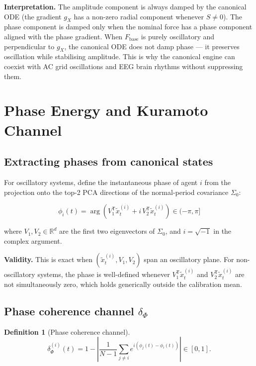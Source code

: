 \documentclass[11pt,a4paper]{article}
\theoremstyle{definition}
\newtheorem{definition}[theorem]{Definition}
\newcommand{\R}{\mathbb{R}}
\newcommand{\T}{^{\mathsf{T}}}
\newcommand{\Fbase}{F_{\mathrm{base}}}
\newcommand{\gX}{g_X}
\begin{document}
\textbf{Interpretation.}
The amplitude component is always damped by the canonical ODE
(the gradient $\gX$ has a non-zero radial component whenever $S \neq 0$).
The phase component is damped only when the nominal force has a phase component
aligned with the phase gradient.
When $\Fbase$ is purely oscillatory and perpendicular to $\gX$,
the canonical ODE does not damp phase — it preserves oscillation while
stabilising amplitude.
This is why the canonical engine can coexist with AC grid oscillations
and EEG brain rhythms without suppressing them.

\section{Phase Energy and Kuramoto Channel}

\subsection{Extracting phases from canonical states}

For oscillatory systems, define the instantaneous phase of agent $i$
from the projection onto the top-2 PCA directions of the normal-period covariance $\Sigma_0$:

\begin{lockedbox}
\[
\phi_i(t) = \arg\!\left(V_1\T\tilde x_t^{(i)} + i\,V_2\T\tilde x_t^{(i)}\right) \in (-\pi, \pi]
\]
\end{lockedbox}

where $V_1, V_2 \in \R^d$ are the first two eigenvectors of $\Sigma_0$,
and $i = \sqrt{-1}$ in the complex argument.

\textbf{Validity.} This is exact when $(\tilde x_t^{(i)}, V_1, V_2)$ span an oscillatory plane.
For non-oscillatory systems, the phase is well-defined whenever
$V_1\T\tilde x_t^{(i)}$ and $V_2\T\tilde x_t^{(i)}$ are not simultaneously zero,
which holds generically outside the calibration mean.

\subsection{Phase coherence channel $\delta_\Phi$}

\begin{definition}[Phase coherence channel]
\[
\delta_\Phi^{(i)}(t) = 1 - \left|\frac{1}{N-1}\sum_{j \neq i} e^{i(\phi_j(t) - \phi_i(t))}\right| \in [0,1].
\]
\end{definition}
\end{document}
